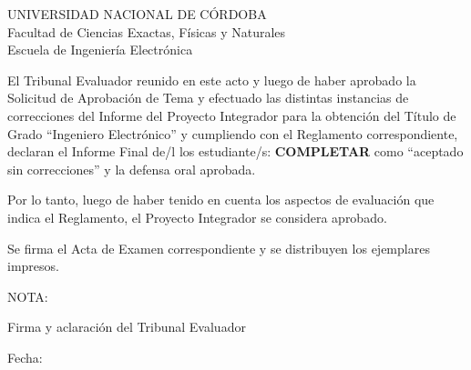 \thispagestyle{empty}

\begin{center}
UNIVERSIDAD NACIONAL DE CÓRDOBA\\
Facultad de Ciencias Exactas, Físicas y Naturales\\
Escuela de Ingeniería Electrónica
\end{center}

\vspace{1.5cm}

El Tribunal Evaluador reunido en este acto y luego de haber aprobado la Solicitud de Aprobación de Tema y efectuado las distintas instancias de correcciones del Informe del Proyecto Integrador para la obtención del Título de Grado ``Ingeniero Electrónico'' y cumpliendo con el Reglamento correspondiente, declaran el Informe Final de/l los estudiante/s: \textbf{COMPLETAR} como ``aceptado sin correcciones'' y la defensa oral aprobada.

Por lo tanto, luego de haber tenido en cuenta los aspectos de evaluación que indica el Reglamento, el Proyecto Integrador se considera aprobado.

\vspace{1cm}

Se firma el Acta de Examen correspondiente y se distribuyen los ejemplares impresos.

\vspace{2cm}

\noindent NOTA:

\vspace{3cm}

\begin{flushright}
Firma y aclaración del Tribunal Evaluador

\vspace{1cm}
Fecha:
\end{flushright}